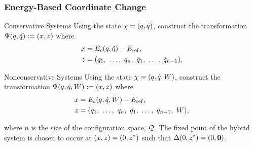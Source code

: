 \begin{frame}[t]
  \frametitle{Energy-Based Coordinate Change}
   {
    \begin{block}{Conservative Systems}
      Using the state $\chi = (q, \dot q)$, construct the transformation
      $\Psi(q, \dot q) := (x, z)$ where
      \begin{align*}
        x &= E_{c}(q, \dot q) - E_{\mathrm{ref}},\\
        z &= (q_{1}, \ \ldots, \ q_{n}, \ \dot q_{1}, \ \ldots, \ \dot q_{n-1}),
      \end{align*}
    \end{block}
  }

   {
    \begin{block}{Nonconservative Systems}
      Using the state $\chi = (q, \dot q, W)$, construct the transformation
      $\Psi(q, \dot q, W) := (x, z)$ where
      \begin{align*}
        x &= E_{c}(q, \dot q, W) - E_{\mathrm{ref}},\\
        z &= (q_{1}, \ \ldots, \ q_{n}, \ \dot q_{1}, \ \ldots, \ \dot q_{n-1}, \ W),
      \end{align*}
    \end{block}
  }
  where $n$ is the size of the configuration space, $\mathcal{Q}$. The fixed point of the
  hybrid system is chosen to occur at $(x, z) = (0, z^{*})$ such that $\Delta(0, z^{*}) =
  (0, {\mathbf 0})$.
\end{frame}

